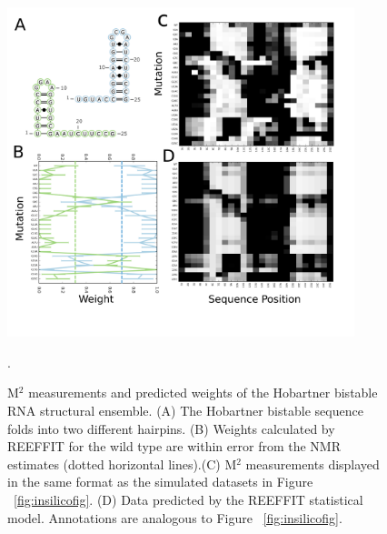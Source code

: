 \documentclass[12pt]{article}
\begin{document}
\begin{figure}[here]
\includegraphics[width=0.9\textwidth]{figures/hobartner.png}
\caption{M$^2$ measurements and predicted weights of the Hobartner bistable RNA structural ensemble. (A) The Hobartner bistable sequence folds into two different hairpins. (B) Weights calculated by REEFFIT for the wild type are within error from the NMR estimates (dotted horizontal lines).(C) M$^2$ measurements displayed in the same format as the simulated datasets in Figure ~\ref{fig:insilicofig}. (D) Data predicted by the REEFFIT statistical model. Annotations are analogous to Figure ~\ref{fig:insilicofig}.}.
\label{fig:hobartnerfig}
\end{figure}
\end{document}
